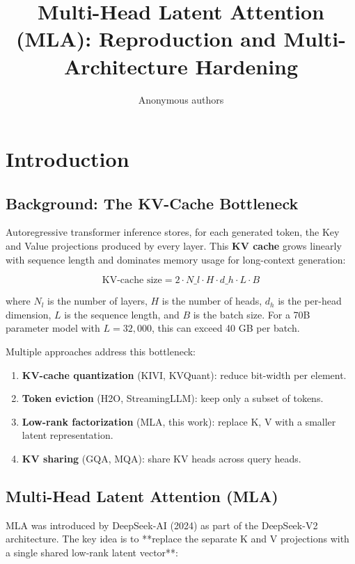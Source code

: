 \title{\textbf{Multi-Head Latent Attention (MLA): Reproduction and Multi-Architecture Hardening}}

\author{Anonymous authors}



\section{Introduction}

\subsection{Background: The KV-Cache Bottleneck}

Autoregressive transformer inference stores, for each generated token, the 
Key and Value projections produced by every layer. This \textbf{KV cache} grows 
linearly with sequence length and dominates memory usage for long-context 
generation:

\[
\text{KV-cache size} = 2 \cdot N\_l \cdot H \cdot d\_h \cdot L \cdot B
\tag{1.1}
\]

where $N_l$ is the number of layers, $H$ is the number of heads, $d_h$ is the 
per-head dimension, $L$ is the sequence length, and $B$ is the batch size. 
For a 70B parameter model with $L = 32{,}000$, this can exceed 40 GB per 
batch.

Multiple approaches address this bottleneck:

\begin{enumerate}
\item \textbf{KV-cache quantization} (KIVI, KVQuant): reduce bit-width per element.
\item \textbf{Token eviction} (H2O, StreamingLLM): keep only a subset of tokens.
\item \textbf{Low-rank factorization} (MLA, this work): replace K, V with a
  smaller latent representation.
\item \textbf{KV sharing} (GQA, MQA): share KV heads across query heads.

\end{enumerate}
\subsection{Multi-Head Latent Attention (MLA)}

MLA was introduced by DeepSeek-AI (2024) as part of the DeepSeek-V2 
architecture. The key idea is to **replace the separate K and V projections 
with a single shared low-rank latent vector**:

